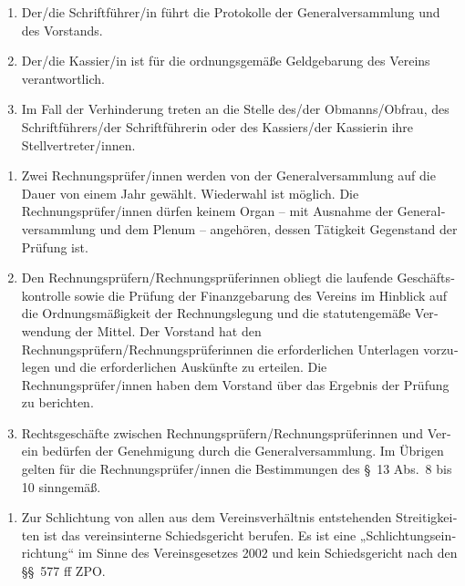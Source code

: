 \begin{otherlanguage}{german}
\begin{enumerate}[statutenenum]
    \item Der/die Schriftführer/in führt die Protokolle der Generalversammlung und des Vorstands.

    \item Der/die Kassier/in ist für die ordnungsgemäße Geldgebarung des Vereins verantwortlich.

    \item Im Fall der Verhinderung treten an die Stelle des/der Obmanns/Obfrau, des Schriftführers/der Schriftführerin oder des Kassiers/der Kassierin ihre Stellvertreter/innen.
\end{enumerate}


\begin{enumerate}[statutenenum]
    \item Zwei Rechnungsprüfer/innen werden von der Generalversammlung auf die Dauer von einem Jahr gewählt.
        Wiederwahl ist möglich.
        Die Rechnungsprüfer/innen dürfen keinem Organ -- mit Ausnahme der Generalversammlung und dem Plenum -- angehören, dessen Tätigkeit Gegenstand der Prüfung ist.

    \item Den Rechnungsprüfern/Rechnungsprüferinnen obliegt die laufende Geschäftskontrolle sowie die Prüfung der Finanzgebarung des Vereins im Hinblick auf die Ordnungsmäßigkeit der Rechnungslegung und die statutengemäße Verwendung der Mittel.
        Der Vorstand hat den Rechnungsprüfern/Rechnungsprüferinnen die erforderlichen Unterlagen vorzulegen und die erforderlichen Auskünfte zu erteilen.
        Die Rechnungsprüfer/innen haben dem Vorstand über das Ergebnis der Prüfung zu berichten.

    \item Rechtsgeschäfte zwischen Rechnungsprüfern/Rechnungsprüferinnen und Verein bedürfen der Genehmigung durch die Generalversammlung.
        Im Übrigen gelten für die Rechnungsprüfer/innen die Bestimmungen des \S\ 13 Abs.\ 8 bis 10 sinngemäß.
\end{enumerate}


\begin{enumerate}[statutenenum]
    \item Zur Schlichtung von allen aus dem Vereinsverhältnis entstehenden Streitigkeiten ist das vereinsinterne Schiedsgericht berufen.
        Es ist eine „Schlichtungseinrichtung“ im Sinne des Vereinsgesetzes 2002 und kein Schiedsgericht nach den \S\S\ 577 ff ZPO.


\end{enumerate}
\end{otherlanguage}
